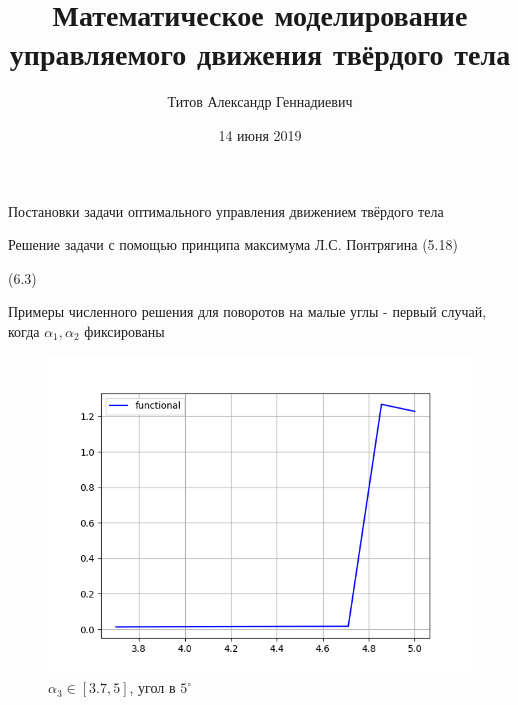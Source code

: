 \documentclass[10pt,utf8,presentation,notheorems,xcolor=dvipsnames,compress]{beamer}
\title[Мат. моделир. управления]{Математическое моделирование управляемого движения твёрдого тела}
\author[Титов А. Г.]{Титов Александр Геннадиевич}
\institute[01.03.02]{«Прикладная математика и информатика»}
\date{14 июня 2019}
\begin{document}

\begin{frame}
\titlepage
\end{frame}

\begin{frame}{Постановки задачи оптимального управления движением твёрдого тела}
\end{frame}

\begin{frame}{Решение задачи с помощью принципа максимума Л.С. Понтрягина}
(5.18)

(6.3)
\end{frame}

\begin{frame}{Примеры численного решения для поворотов на малые углы - первый случай, когда $\alpha_1, \alpha_2$ фиксированы}
\begin{figure}[H]
\center\includegraphics[scale=0.5]{fig/functional_3_7-5_5.png}
\caption{$\alpha_3 \in [3.7, 5]$, угол в $5^{\circ}$}
\end{figure}
\end{frame}
\end{document}
